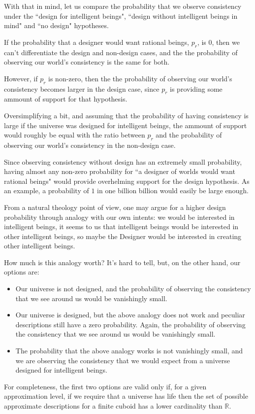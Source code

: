 \documentclass[a4paper
,draft
]{article}
\def\reale{\mathbb{R}}
\newcommand{\ghilimele}[1]{``#1"}
\begin{document}
With that in mind, let us compare the probability that
we observe consistency under the \ghilimele{design for intelligent beings},
\ghilimele{design without intelligent beings in mind} and
\ghilimele{no design} hypotheses.

If the probability that a
designer would want rational beings, $p_r$, is $0$, then we can't
differentiate the design and non-design cases, and the
the probability of observing our world's consistency is the same
for both.

However, if $p_r$ is non-zero, then the
the probability of observing our world's consistency becomes larger in the
design case, since $p_r$ is providing some ammount of support for that
hypothesis.

Oversimplifying a bit, and assuming that the probability of having consistency
is large if the universe was designed for intelligent beings,
the ammount of support would
roughly be equal with the ratio between $p_r$ and the probability of observing
our world's consistency in the non-design case.

Since observing consistency without design has an extremely
small probability,
having almost any non-zero probability for
\ghilimele{a designer of worlds would want rational beings} would provide
overhelming support for the design hypothesis.
As an example, a probability
of $1$ in one billion billion would easily be large enough.

From a natural theology point of view, one may argue for a higher design
probability through analogy with our own intents: we would be interested
in intelligent beings, it seems to us that intelligent beings would be
interested in other intelligent beings, so maybe the Designer would be
interested in creating other intelligent beings.

How much is this analogy worth?
It's hard to tell, but, on the other hand, our options are:

\begin{itemize}
  \item Our universe is not designed,
        and the probability of observing the
        consistency that we see around us would be vanishingly small.
  \item Our universe is designed, but the above analogy does not work and
        peculiar descriptions still have a zero probability.
        Again, the probability of observing the
        consistency that we see around us would be vanishingly small.
  \item The probability that the above analogy works is not vanishingly small,
        and we are observing the consistency that we would expect from a
        universe designed for intelligent beings.
\end{itemize}
For completeness, the first two options are valid only if,
for a given approximation level, if we require that a universe has life then
the set of possible approximate descriptions for a finite cuboid
has a lower cardinality than $\reale$.
\end{document}
